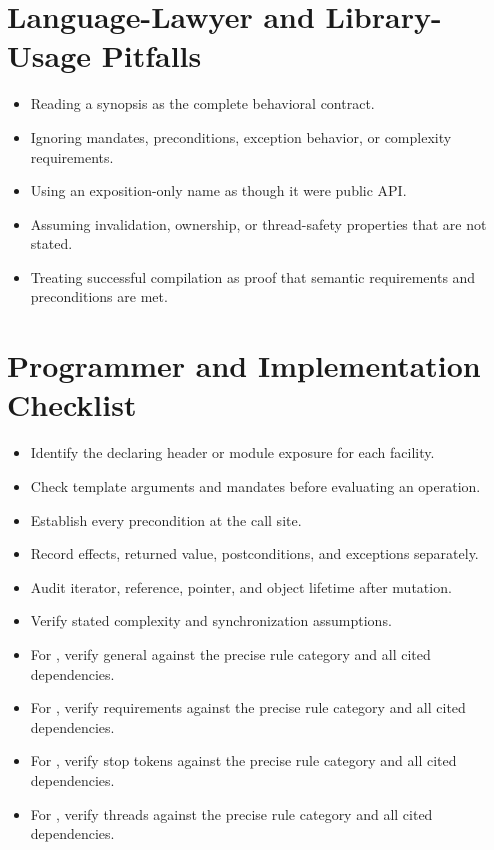 \documentclass[11pt,letterpaper]{article}
\begin{document}
\section{Language-Lawyer and Library-Usage Pitfalls}
\begin{CornellReferencePitfallBox}\begin{itemize}[label=\textcolor{CornellReferenceAmber}{$\blacktriangleright$}]
\item Reading a synopsis as the complete behavioral contract.
\item Ignoring mandates, preconditions, exception behavior, or complexity requirements.
\item Using an exposition-only name as though it were public API.
\item Assuming invalidation, ownership, or thread-safety properties that are not stated.
\item Treating successful compilation as proof that semantic requirements and preconditions are met.
\end{itemize}\end{CornellReferencePitfallBox}
\section{Programmer and Implementation Checklist}
\begin{CornellReferenceChecklistBox}\begin{itemize}[label=$\square$]
\item Identify the declaring header or module exposure for each facility.
\item Check template arguments and mandates before evaluating an operation.
\item Establish every precondition at the call site.
\item Record effects, returned value, postconditions, and exceptions separately.
\item Audit iterator, reference, pointer, and object lifetime after mutation.
\item Verify stated complexity and synchronization assumptions.
\item For , verify general against the precise rule category and all cited dependencies.
\item For , verify requirements against the precise rule category and all cited dependencies.
\item For , verify stop tokens against the precise rule category and all cited dependencies.
\item For , verify threads against the precise rule category and all cited dependencies.
\end{itemize}\end{CornellReferenceChecklistBox}
\end{document}
